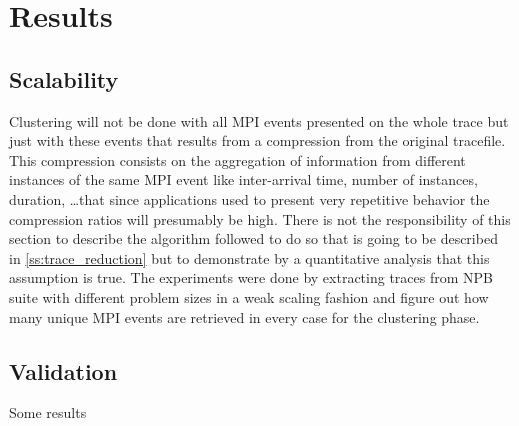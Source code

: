 \chapter{Results}

\section{Scalability}\label{s:scalability}

Clustering will not be done with all MPI events presented on the whole trace but
just with these events that results from a compression from the original
tracefile. This compression consists on the aggregation of information from 
different instances of the same MPI event like inter-arrival time, number of
instances, duration, \ldots that since applications used to present very repetitive 
behavior the compression ratios will presumably be high. There is not the
responsibility of this section to describe the algorithm followed to do so that
is going to be described in \ref{ss:trace_reduction} but to demonstrate by a
quantitative analysis that this assumption is true. The experiments were done
by extracting traces from NPB suite with different problem sizes in a weak
scaling fashion and figure out how many unique MPI events are retrieved 
in every case for the clustering phase.

\section{Validation}\label{s:validation}

Some results
